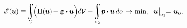 \nopagebreak\vspace{-0.2em}
\begin{equation}\label{principleofminimumpotentialenergy.formulation}
\potentialenergyfunctional \hspace{.2ex} (\hspace{-0.1ex}\bm{u}\hspace{-0.1ex}) \equiv \hspace{-0.2ex}
\displaystyle\integral\displaylimits_{\mathcal{V}} \hspace{-0.4ex}
\Bigl(
\potentialenergydensity (\hspace{-0.1ex}\bm{u}\hspace{-0.1ex}) \hspace{-0.1ex} - \volumeloadvector \hspace{-0.1ex} \dotp \bm{u}
\Bigr) \hspace{-0.1ex} d\mathcal{V} \hspace{.1ex}
- \hspace{-0.3ex}
\displaystyle\integral\displaylimits_{o_2} \hspace{-0.4ex}
\bm{p} \dotp \bm{u} \hspace{.33ex} do \hspace{.2ex}
\hspace{.1ex}\to\hspace{.25ex} \mathrm{min}
\hspace{.15ex} , \hspace{.5em}
\bm{u} \hspace{.1ex} \bigr|_{o_1} \hspace{-0.8ex} = \hspace{.1ex} \bm{u}_{\raisemath{-0.1em}{0}}
\hspace{.16ex} .
\end{equation}

